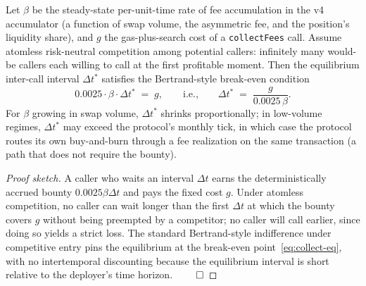 \begin{theorem}
\label{thm:collect-equilibrium}
Let $\beta$ be the steady-state per-unit-time rate of fee accumulation in the v4 accumulator (a function of swap volume, the asymmetric fee, and the position's liquidity share), and $g$ the gas-plus-search cost of a \texttt{collectFees} call. Assume atomless risk-neutral competition among potential callers: infinitely many would-be callers each willing to call at the first profitable moment. Then the equilibrium inter-call interval $\Delta t^*$ satisfies the Bertrand-style break-even condition
\begin{equation}
0.0025 \cdot \beta \cdot \Delta t^* \;=\; g,
\qquad
\text{i.e.,} \qquad
\Delta t^* \;=\; \frac{g}{0.0025 \,\beta}.
\label{eq:collect-eq}
\end{equation}
For $\beta$ growing in swap volume, $\Delta t^*$ shrinks proportionally; in low-volume regimes, $\Delta t^*$ may exceed the protocol's monthly tick, in which case the protocol routes its own buy-and-burn through a fee realization on the same transaction (a path that does not require the bounty).
\end{theorem}

\begin{proof}[Proof sketch]
A caller who waits an interval $\Delta t$ earns the deterministically accrued bounty $0.0025 \beta \Delta t$ and pays the fixed cost $g$. Under atomless competition, no caller can wait longer than the first $\Delta t$ at which the bounty covers $g$ without being preempted by a competitor; no caller will call earlier, since doing so yields a strict loss. The standard Bertrand-style indifference under competitive entry pins the equilibrium at the break-even point~\eqref{eq:collect-eq}, with no intertemporal discounting because the equilibrium interval is short relative to the deployer's time horizon. $\qed$
\end{proof}
